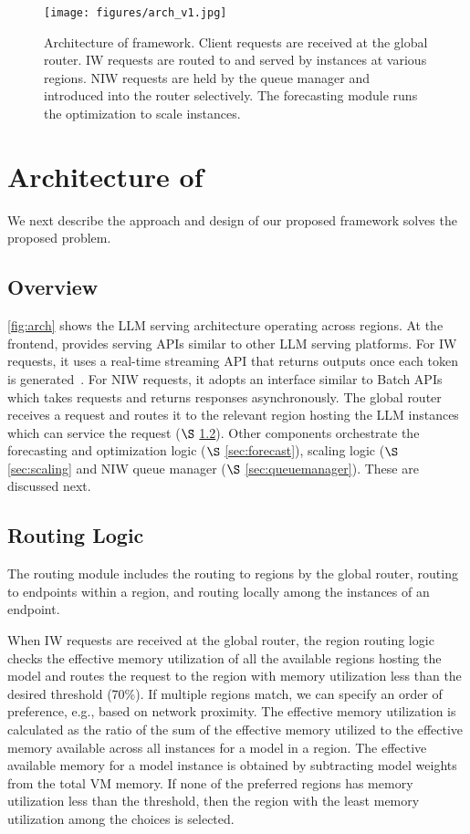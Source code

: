 \begin{figure*}[t!]
    \centering
    \texttt{[image: figures/arch\_v1.jpg]}
    \caption{Architecture of \sys framework. Client requests are received at the global router. IW requests are routed to and served by instances at various regions. NIW requests are held by the queue manager and introduced into the router selectively. The forecasting module runs the optimization to scale instances. %
    }
    \label{fig:arch}
\end{figure*}

\section{Architecture of \sys}
\label{sec:arch}
We next describe the approach and design of our proposed \sys framework solves the proposed problem.
\subsection{Overview}

\autoref{fig:arch} shows the \sys LLM serving architecture operating across regions. At the frontend, \sys provides serving APIs similar to other LLM serving platforms. For IW requests, it uses a real-time streaming API that returns outputs once each token is
generated~\cite{streamAPI,aoai-stream}. For NIW requests, it adopts an interface similar to Batch APIs~\cite{BatchAPI,aoai-batch} which takes requests and returns responses asynchronously. The global router receives a request and routes it to the relevant region hosting the LLM instances which can service the request ($\S$ \ref{sec:instancerouter}). Other components orchestrate the forecasting and optimization logic ($\S $ \ref{sec:forecast}), scaling logic ($\S$ \ref{sec:scaling} and NIW queue manager ($\S$ \ref{sec:queuemanager}). These are discussed next. 

\subsection{Routing Logic}\label{sec:instancerouter}
The routing module includes the routing to regions by the global router, routing to endpoints within a region, and routing locally among the instances of an endpoint.

When IW requests are received at the global router, the region routing logic checks the effective memory utilization of all the available regions hosting the model and routes the request to the region with memory utilization less than the desired threshold (70\%).
If multiple regions match, we can specify an order of preference, e.g., based on network proximity.
The effective memory utilization is calculated as the ratio of the sum of the effective memory utilized to the effective memory available across all instances for a model in a region. The effective available memory for a model instance is obtained by subtracting model weights from the total VM memory. If none of the preferred regions has memory utilization less than the threshold, then the region with the least memory utilization among the choices is selected.

